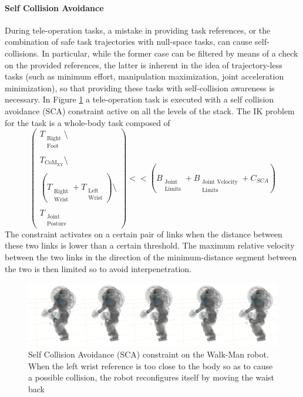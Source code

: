 \paragraph{Self Collision Avoidance} 
During tele-operation tasks, a mistake in providing task references, or the combination of safe task trajectories with null-space tasks, can cause self-collisions. In particular, while the former case can be filtered by means of a check on the provided references, the latter is inherent in the idea of trajectory-less tasks (such as minimum effort, manipulation maximization, joint acceleration minimization), so that providing these tasks with self-collision awareness is necessary. In Figure \ref{fig:sca} a tele-operation task is executed with a self collision avoidance (SCA) constraint active on all the levels of the stack.
The IK problem for the task is a whole-body task composed of
\begin{equation}
\begin{pmatrix}
T_{\substack{\text{Right}\\\text{Foot}}}\setminus\\
\\
T_{\text{CoM}_\text{XY}}\setminus\\ 
\\
\left(T_{\substack{\text{Right}\\\text{Wrist}}} + T_{\substack{\text{Left}\\\text{Wrist}}}\right)\setminus\\ 
\\
T_{\substack{\text{Joint}\\\text{Posture}}}
\end{pmatrix}
<< \left(B_{\substack{\text{Joint}\\\text{Limits}}} + B_{\substack{\text{Joint Velocity}\\\text{Limits}}} + C_{SCA}\right)
\end{equation}
The constraint activates on a certain pair of links when the distance between these two links is lower than a certain threshold. The maximum relative velocity between the two links in the direction of the minimum-distance segment between the two is then limited so to avoid interpenetration.

\begin{figure}[!h]
\vspace{2 mm}
\centering
\includegraphics[width=\textwidth]{images/sca/sca}
\caption{Self Collision Avoidance (SCA) constraint on the Walk-Man robot.  When the left wrist reference is too close to the body so as to cause a possible collision, the robot reconfigures itself by moving the waist back}
\label{fig:sca}
\end{figure}

